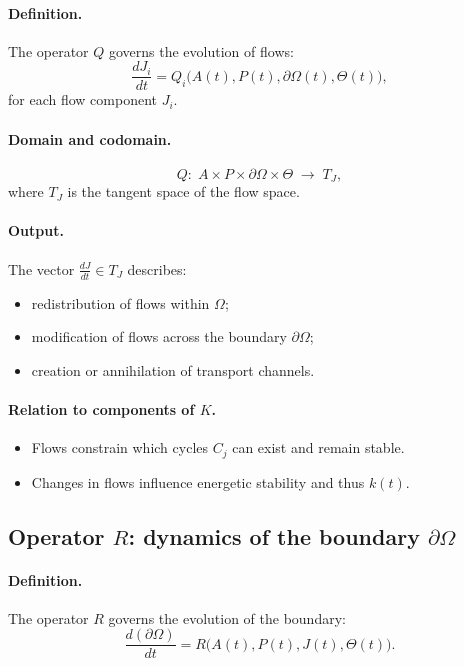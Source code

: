 \paragraph{Definition.}
The operator \(Q\) governs the evolution of flows:
\[
  \frac{dJ_i}{dt} = Q_i\bigl(A(t),P(t),\partial\Omega(t),\Theta(t)\bigr),
\]
for each flow component \(J_i\).

\paragraph{Domain and codomain.}
\[
  Q:\; A\times P\times \partial\Omega\times\Theta \;\longrightarrow\; T_J,
\]
where \(T_J\) is the tangent space of the flow space.

\paragraph{Output.}
The vector \(\frac{dJ}{dt}\in T_J\) describes:
\begin{itemize}
  \item redistribution of flows within \(\Omega\);
  \item modification of flows across the boundary \(\partial\Omega\);
  \item creation or annihilation of transport channels.
\end{itemize}

\paragraph{Relation to components of \texorpdfstring{\(K\)}{K}.}
\begin{itemize}
  \item Flows constrain which cycles \(C_j\) can exist and remain stable.
  \item Changes in flows influence energetic stability and thus \(k(t)\).
\end{itemize}

\subsection{Operator \texorpdfstring{\(R\)}{R}: dynamics of the boundary \texorpdfstring{\(\partial\Omega\)}{\partial\Omega}}

\paragraph{Definition.}
The operator \(R\) governs the evolution of the boundary:
\[
  \frac{d(\partial\Omega)}{dt} = R\bigl(A(t),P(t),J(t),\Theta(t)\bigr).
\]

